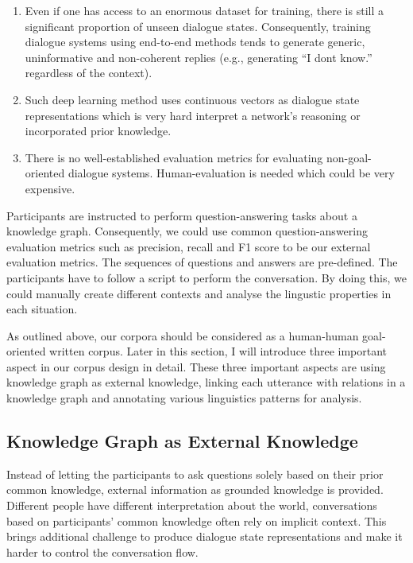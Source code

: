 \documentclass[bsc,frontabs,twoside,singlespacing,parskip,deptreport]{infthesis}     %
\begin{document}
\begin{enumerate}
   \item Even if one has access to an enormous dataset for training, there is still a significant proportion of unseen dialogue states. Consequently, training dialogue systems using end-to-end methods tends to generate generic, uninformative and non-coherent replies (e.g., generating “I dont know.” regardless of the context). 
   
   
   \item Such deep learning method uses continuous vectors as dialogue state representations which is very hard interpret a network’s reasoning or incorporated prior knowledge. 
 
   \item There is no well-established evaluation metrics for evaluating non-goal-oriented dialogue systems. Human-evaluation is needed which could be very expensive.
       
\end{enumerate}

Participants are instructed to perform question-answering tasks about a knowledge graph. Consequently, we could use common question-answering evaluation metrics such as precision, recall and F1 score to be our external evaluation metrics. The sequences of questions and answers are pre-defined. The participants have to follow a script to perform the conversation. By doing this, we could manually create different contexts and analyse the lingustic properties in each situation. 

As outlined above, our corpora should be considered as a human-human goal-oriented written corpus. Later in this section, I will introduce three important aspect in our corpus design in detail. These three important aspects are using knowledge graph as external knowledge, linking each utterance with relations in a knowledge graph and annotating various linguistics patterns for analysis.


\subsection{Knowledge Graph as External Knowledge}


Instead of letting the participants to ask questions solely based on their prior common knowledge, external information as grounded knowledge is provided. Different people have different interpretation about the world, conversations based on participants' common knowledge often rely on implicit context. This brings additional challenge to produce dialogue state representations and make it harder to control the conversation flow.
\end{document}
